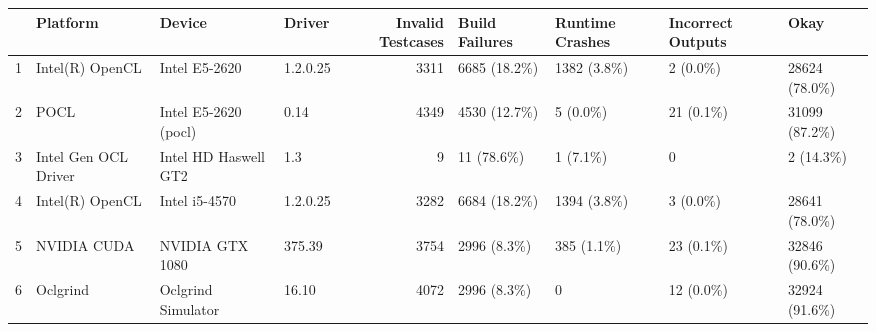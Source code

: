 \begin{tabular}{llllrllll}
\toprule
{} &              Platform &                Device &    Driver &  Invalid Testcases & Build Failures & Runtime Crashes & Incorrect Outputs &           Okay \\
\midrule
1 &       Intel(R) OpenCL &         Intel E5-2620 &  1.2.0.25 &               3311 &   6685 (18.2\%) &     1382 (3.8\%) &          2 (0.0\%) &  28624 (78.0\%) \\
2 &                  POCL &  Intel E5-2620 (pocl) &      0.14 &               4349 &   4530 (12.7\%) &        5 (0.0\%) &         21 (0.1\%) &  31099 (87.2\%) \\
3 &  Intel Gen OCL Driver &  Intel HD Haswell GT2 &       1.3 &                  9 &     11 (78.6\%) &        1 (7.1\%) &                 0 &      2 (14.3\%) \\
4 &       Intel(R) OpenCL &         Intel i5-4570 &  1.2.0.25 &               3282 &   6684 (18.2\%) &     1394 (3.8\%) &          3 (0.0\%) &  28641 (78.0\%) \\
5 &           NVIDIA CUDA &       NVIDIA GTX 1080 &    375.39 &               3754 &    2996 (8.3\%) &      385 (1.1\%) &         23 (0.1\%) &  32846 (90.6\%) \\
6 &              Oclgrind &    Oclgrind Simulator &     16.10 &               4072 &    2996 (8.3\%) &               0 &         12 (0.0\%) &  32924 (91.6\%) \\
\bottomrule
\end{tabular}
